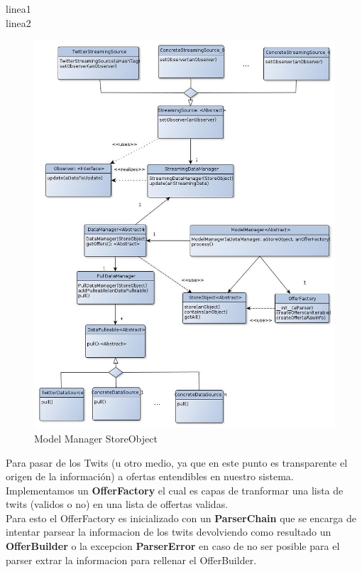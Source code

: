 \documentclass[10pt, a4paper]{article}
\begin{document}
\newpage
linea1\\
linea2\\
\begin{figure}[H]
\centering
\includegraphics[scale=0.6]{graphics/model_manager_storeObject_class.jpg}
\caption{Model Manager StoreObject}
\end{figure}

\newpage
Para pasar de los Twits (u otro medio, ya que en este punto es transparente el origen de la información) a ofertas entendibles en nuestro sistema. Implementamos un \textbf{OfferFactory} el cual es capas de tranformar una lista de twits (validos o no) en una lista de offertas validas.\\

Para esto el OfferFactory es inicializado con un \textbf{ParserChain} que se encarga de intentar parsear la informacion de los twits devolviendo como resultado un \textbf{OfferBuilder} o la excepcion  \textbf{ParserError} en caso de no ser posible para el parser extrar la informacion para rellenar el OfferBuilder.\\
\end{document}
